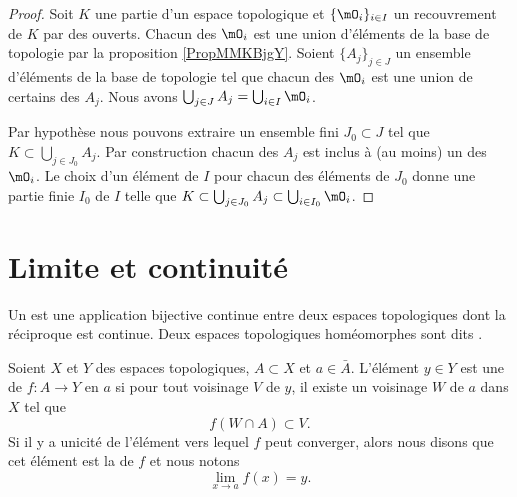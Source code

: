 \begin{proof}
    Soit \( K\) une partie d'un espace topologique et \( \{ \mO_i \}_{i\in I}\) un recouvrement de \( K\) par des ouverts. Chacun des \( \mO_i\) est une union d'éléments de la base de topologie par la proposition \ref{PropMMKBjgY}. Soient \( \{ A_j \}_{j\in J}\) un ensemble d'éléments de la base de topologie tel que chacun des \( \mO_i\) est une union de certains des \( A_j\). Nous avons \( \bigcup_{j\in J}A_j=\bigcup_{i\in I}\mO_i\).

    Par hypothèse nous pouvons extraire un ensemble fini \( J_0\subset J\) tel que \( K\subset\bigcup_{j\in J_0}A_j\). Par construction chacun des \( A_j\) est inclus à (au moins) un des \( \mO_i\). Le choix d'un élément de \( I\) pour chacun des éléments de \( J_0\) donne une partie finie \( I_0\) de \( I\) telle que \( K\subset\bigcup_{j\in J_0}A_j\subset\bigcup_{i\in I_0}\mO_i\).
\end{proof}

\section{Limite et continuité}

\begin{definition}
    Un  est une application bijective continue entre deux espaces topologiques dont la réciproque est continue. Deux espaces topologiques homéomorphes sont dits .
\end{definition}

\begin{definition}\label{DefYNVoWBx}
    Soient \( X\) et \( Y\) des espaces topologiques, \( A\subset X\) et \( a\in\bar A\). L'élément \( y\in Y\) est une  de \( f\colon A\to Y\) en \( a\) si pour tout voisinage \( V\) de \( y\), il existe un voisinage \( W\) de \( a\) dans \( X\) tel que 
    \begin{equation}
        f(W\cap A)\subset V.
    \end{equation}
    Si il y a unicité de l'élément vers lequel \( f\) peut converger, alors nous disons que cet élément est la  de \( f\) et nous notons
    \begin{equation}
        \lim_{x\to a} f(x)=y.
    \end{equation}
\end{definition}

